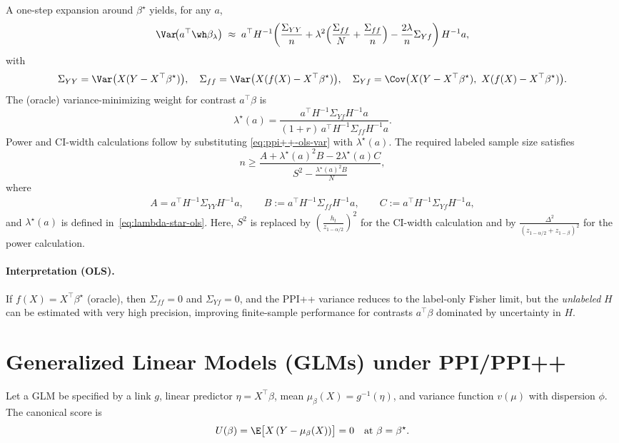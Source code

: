 A one-step expansion around $\beta^\star$ yields, for any $a$,
\begin{equation}\label{eq:ppi++-ols-var}
\Var\!\big(a^\top\wh\beta_\lambda\big)
\;\approx\;
a^\top H^{-1}\!\left(
\frac{\Sigma_{YY}}{n}
+\lambda^2\Big(\frac{\Sigma_{ff}}{N}+\frac{\Sigma_{ff}}{n}\Big)
-\frac{2\lambda}{n}\Sigma_{Yf}
\right)H^{-1}a,
\end{equation}
with
\[
\Sigma_{YY}=\Var\big(X(Y-X^\top\beta^\star)\big),\quad
\Sigma_{ff}=\Var\big(X(f(X)-X^\top\beta^\star)\big),\quad
\Sigma_{Yf}=\Cov\big(X(Y-X^\top\beta^\star),\ X(f(X)-X^\top\beta^\star)\big).
\]
The (oracle) variance-minimizing weight for contrast $a^\top\beta$ is
\begin{equation}\label{eq:lambda-star-ols}
\lambda^\star(a)
=
\frac{a^\top H^{-1}\Sigma_{Yf}H^{-1}a}{(1+r)\,a^\top H^{-1}\Sigma_{ff}H^{-1}a}.
\end{equation}
Power and CI-width calculations follow by substituting \eqref{eq:ppi++-ols-var} with $\lambda^\star(a)$. The required labeled sample size satisfies
\begin{equation}
\label{eq:n-for-ols}
    n\geq \frac{A+\lambda^\star(a)^2  B-2\lambda^\star(a) C}{S^2-\frac{\lambda^\star(a)^2  B}{N}},
\end{equation}where \begin{align*}
A=a^\top H^{-1}\Sigma_{YY}H^{-1}a,\qquad
B:=a^\top H^{-1}\Sigma_{ff}H^{-1}a,\qquad
C:=a^\top H^{-1}\Sigma_{Yf}H^{-1}a,
\end{align*} and $\lambda^\star(a)$ is defined in~\eqref{eq:lambda-star-ols}. Here, $S^2$ is replaced by $\left(\frac{h_t}{z_{1-\alpha/2}}\right)^2$ for the CI-width calculation and by $\frac{\Delta^2}{(z_{1-\alpha/2}+z_{1-\beta})^2}$ for the power calculation.

\paragraph{Interpretation (OLS).}
If $f(X)=X^\top\beta^\star$ (oracle), then $\Sigma_{ff}=0$ and $\Sigma_{Yf}=0$, and the PPI++ variance reduces to the label-only Fisher limit, but the \emph{unlabeled} $H$ can be estimated with very high precision, improving finite-sample performance for contrasts $a^\top\beta$ dominated by uncertainty in $H$.

\section{Generalized Linear Models (GLMs) under PPI/PPI++}
\label{sec:GLM}
Let a GLM be specified by a link $g$, linear predictor $\eta=X^\top\beta$, mean $\mu_\beta(X)=g^{-1}(\eta)$, and variance function $v(\mu)$ with dispersion $\phi$. The canonical score is
\begin{equation}
U(\beta)=\E\big[ X\,(Y-\mu_\beta(X)) \big]=0 \quad \text{at } \beta=\beta^\star.
\label{eq:canonical-score}
\end{equation}

